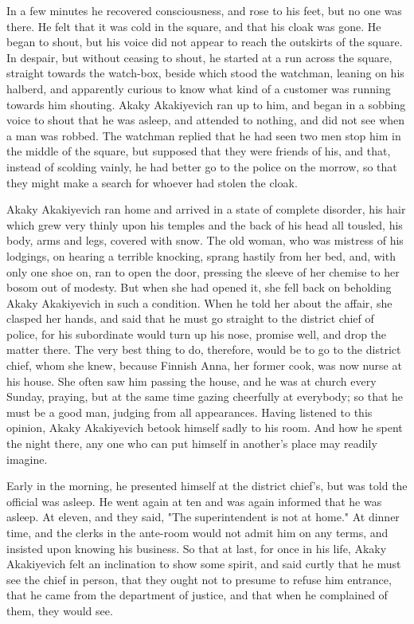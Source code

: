In a few minutes he recovered consciousness, and rose to his feet, but
no one was there. He felt that it was cold in the square, and that his
cloak was gone. He began to shout, but his voice did not appear to
reach the outskirts of the square. In despair, but without ceasing to
shout, he started at a run across the square, straight towards the
watch-box, beside which stood the watchman, leaning on his halberd,
and apparently curious to know what kind of a customer was running
towards him shouting. Akaky Akakiyevich ran up to him, and began in a
sobbing voice to shout that he was asleep, and attended to nothing,
and did not see when a man was robbed. The watchman replied that he
had seen two men stop him in the middle of the square, but supposed
that they were friends of his, and that, instead of scolding vainly,
he had better go to the police on the morrow, so that they might make
a search for whoever had stolen the cloak.

Akaky Akakiyevich ran home and arrived in a state of complete
disorder, his hair which grew very thinly upon his temples and the
back of his head all tousled, his body, arms and legs, covered with
snow. The old woman, who was mistress of his lodgings, on hearing a
terrible knocking, sprang hastily from her bed, and, with only one
shoe on, ran to open the door, pressing the sleeve of her chemise to
her bosom out of modesty. But when she had opened it, she fell back on
beholding Akaky Akakiyevich in such a condition. When he told her
about the affair, she clasped her hands, and said that he must go
straight to the district chief of police, for his subordinate would
turn up his nose, promise well, and drop the matter there. The very
best thing to do, therefore, would be to go to the district chief,
whom she knew, because Finnish Anna, her former cook, was now nurse at
his house. She often saw him passing the house, and he was at church
every Sunday, praying, but at the same time gazing cheerfully at
everybody; so that he must be a good man, judging from all
appearances. Having listened to this opinion, Akaky Akakiyevich betook
himself sadly to his room. And how he spent the night there, any one
who can put himself in another's place may readily imagine.

Early in the morning, he presented himself at the district chief's,
but was told the official was asleep. He went again at ten and was
again informed that he was asleep. At eleven, and they said, "The
superintendent is not at home." At dinner time, and the clerks in the
ante-room would not admit him on any terms, and insisted upon knowing
his business. So that at last, for once in his life, Akaky Akakiyevich
felt an inclination to show some spirit, and said curtly that he must
see the chief in person, that they ought not to presume to refuse him
entrance, that he came from the department of justice, and that when
he complained of them, they would see.

